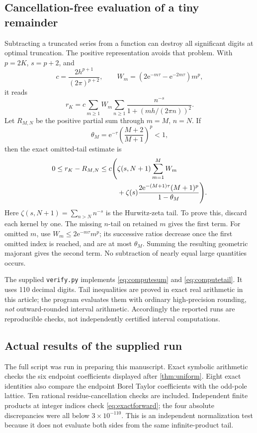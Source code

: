 \documentclass[11pt,a4paper]{article}
\theoremstyle{definition}
\theoremstyle{remark}
\newcommand{\e}{\mathrm e}
\begin{document}
\subsection{Cancellation-free evaluation of a tiny remainder}
Subtracting a truncated series from a function can destroy all significant
digits at optimal truncation. The positive representation avoids that
problem. With $p=2K$, $s=p+2$, and
\[
 c=\frac{2h^{p+1}}{(2\pi)^{p+2}},\qquad
 W_m=(2\e^{-m\tau}-\e^{-2m\tau})m^p,
\]
it reads
\begin{equation}
 r_K=c\sum_{m\ge1}W_m
        \sum_{n\ge1}\frac{n^{-s}}{1+(mh/(2\pi n))^2}.
 \label{eq:computesum}
\end{equation}
Let $R_{M,N}$ be the positive partial sum through $m=M$, $n=N$.
If
\[
 \theta_M=\e^{-\tau}\left(\frac{M+2}{M+1}\right)^p<1,
\]
then the exact omitted-tail estimate is
\begin{align}
 0\le r_K-R_{M,N}\le c\Bigg(&\zeta(s,N+1)\sum_{m=1}^M W_m\notag\\
 &+\zeta(s)\frac{2\e^{-(M+1)\tau}(M+1)^p}{1-\theta_M}\Bigg).
 \label{eq:computetail}
\end{align}
Here $\zeta(s,N+1)=\sum_{n>N}n^{-s}$ is the Hurwitz-zeta tail.
To prove this, discard each kernel by one. The missing $n$-tail on retained
$m$ gives the first term. For omitted $m$, use $W_m\le2\e^{-m\tau}m^p$;
its successive ratios decrease once the first omitted index is reached,
and are at most $\theta_M$. Summing the resulting geometric majorant
gives the second term. No subtraction of nearly equal large quantities
occurs.

The supplied \texttt{verify.py} implements \eqref{eq:computesum} and
\eqref{eq:computetail}. It uses 110 decimal digits. Tail inequalities are
proved in exact real arithmetic in this article; the program evaluates
them with ordinary high-precision rounding, \emph{not} outward-rounded
interval arithmetic. Accordingly the reported runs are reproducible
checks, not independently certified interval computations.

\subsection{Actual results of the supplied run}
The full script was run in preparing this manuscript. Exact symbolic
arithmetic checks the six endpoint coefficients displayed after
\cref{thm:uniform}. Eight exact identities also compare the endpoint Borel Taylor
coefficients with the odd-pole lattice. Ten rational residue-cancellation
checks are included. Independent finite products at integer indices check
\eqref{eq:exactforward}; the four absolute discrepancies were all below
$3\times10^{-110}$. This is an independent normalization test because it
does not evaluate both sides from the same infinite-product tail.
\end{document}
